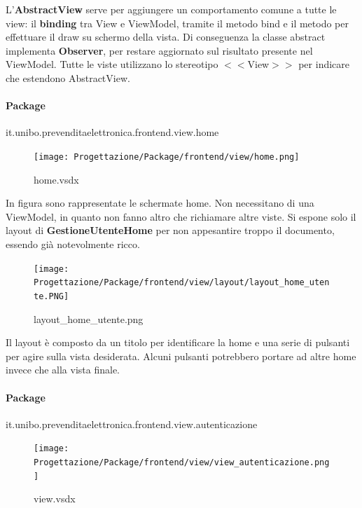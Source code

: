 \documentclass[a4paper]{article}
\begin{document}
L'\textbf{AbstractView} serve per aggiungere un comportamento comune a tutte le view: il \textbf{binding} tra View e ViewModel, tramite il metodo bind e il metodo per effettuare il draw su schermo della vista. Di conseguenza la classe abstract implementa \textbf{Observer}, per restare aggiornato sul risultato presente nel ViewModel. Tutte le viste utilizzano lo stereotipo $<<$View$>>$ per indicare che estendono AbstractView.

\newpage

\paragraph{Package} it.unibo.prevenditaelettronica.frontend.view.home



\begin{figure}[H]
    \texttt{[image: Progettazione/Package/frontend/view/home.png]}
    \centering
    \caption{home.vsdx}
\end{figure}

In figura sono rappresentate le schermate home. Non necessitano di una ViewModel, in quanto non fanno altro che richiamare altre viste. Si espone solo il layout di \textbf{GestioneUtenteHome} per non appesantire troppo il documento, essendo già notevolmente ricco.

\begin{figure}[H]
    \texttt{[image: Progettazione/Package/frontend/view/layout/layout\_home\_utente.PNG]}
    \centering
    \caption{layout\_home\_utente.png}
\end{figure}

Il layout è composto da un titolo per identificare la home e una serie di pulsanti per agire sulla vista desiderata. Alcuni pulsanti potrebbero portare ad altre home invece che alla vista finale.

\newpage

\paragraph{Package} it.unibo.prevenditaelettronica.frontend.view.autenticazione


\begin{figure}[H]
    \texttt{[image: Progettazione/Package/frontend/view/view\_autenticazione.png]}
    \centering
    \caption{view.vsdx}
\end{figure}
\end{document}
